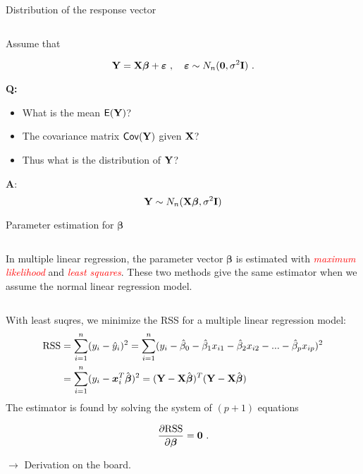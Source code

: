 \documentclass[10pt,ignorenonframetext,]{beamer}
\begin{document}
\begin{frame}

\begin{block}{Distribution of the response vector}

\(~\)

Assume that

\[{\bf Y=X \boldsymbol\beta}+{\boldsymbol \varepsilon} \ , \quad \boldsymbol\varepsilon\sim N_n({\bf 0},\sigma^2 {\bf I}) \ . \]

\vspace{4mm}

\textbf{Q:}

\begin{itemize}
\item
  What is the mean \(\mathsf{E}(\bf Y)\)?
\item
  The covariance matrix \(\mathsf{Cov}(\bf Y)\) given \(\bf{X}\)?
\item
  Thus what is the distribution of \(\bf Y\)?
\end{itemize}

\end{block}

\end{frame}

\begin{frame}

\textbf{A}:
\[ {\bf Y} \sim N_{n}({\bf X} {\boldsymbol\beta},\sigma^2 {\bf I})\]

\end{frame}

\begin{frame}

\begin{block}{Parameter estimation for \(\boldsymbol{\beta}\)}

\(~\)

In multiple linear regression, the parameter vector \(\boldsymbol\beta\)
is estimated with \emph{\textcolor{red}{maximum likelihood}} and
\emph{\textcolor{red}{least squares}}. These two methods give the same
estimator when we assume the normal linear regression model.

\(~\)

With least suqres, we minimize the RSS for a multiple linear regression
model:
\[\begin{aligned} \text{RSS} &=\sum_{i=1}^n (y_i - \hat y_i)^2 = \sum_{i=1}^n (y_i - \hat \beta_0 - \hat \beta_1 x_{i1} - \hat \beta_2 x_{i2} -...-\hat \beta_p x_{ip} )^2 \\
&= \sum_{i=1}^n (y_i-{\boldsymbol x}_i^T \hat{\boldsymbol\beta})^2=({\bf Y}-{\bf X}\hat{\boldsymbol{\beta}})^T({\bf Y}-{\bf X}\hat{\boldsymbol{\beta}})\end{aligned}\]
The estimator is found by solving the system of \((p+1)\) equations

\[\frac{\partial \text{RSS}}{\partial \boldsymbol \beta}={\bf 0} \ .\]

\(\rightarrow\) Derivation on the board.

\end{block}

\end{frame}
\end{document}
